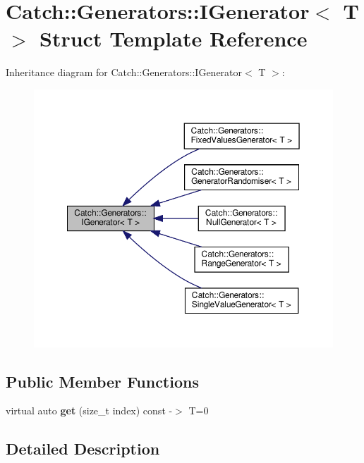 \hypertarget{structCatch_1_1Generators_1_1IGenerator}{}\section{Catch\+::Generators\+::I\+Generator$<$ T $>$ Struct Template Reference}
\label{structCatch_1_1Generators_1_1IGenerator}


Inheritance diagram for Catch\+::Generators\+::I\+Generator$<$ T $>$\+:\nopagebreak
\begin{figure}[H]
\begin{center}
\leavevmode
\includegraphics[width=350pt]{structCatch_1_1Generators_1_1IGenerator__inherit__graph}
\end{center}
\end{figure}
\subsection*{Public Member Functions}
\begin{DoxyCompactItemize}
\item 
\mbox{\label{structCatch_1_1Generators_1_1IGenerator_a737a89eb0bff02e580e36c59fb0d1171}} 
virtual auto {\bfseries get} (size\+\_\+t index) const -\/$>$ T=0
\end{DoxyCompactItemize}


\subsection{Detailed Description}
